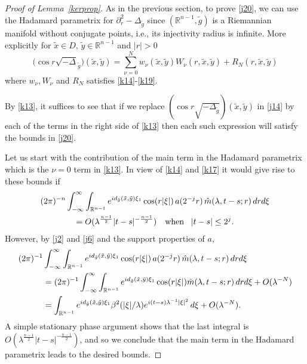 \documentclass[10pt]{amsart}
\newcommand{\la}{\lambda}
\newcommand{\1}{{\bf 1}}
\begin{document}
\begin{proof}[Proof of Lemma~\ref{kerprop}]
As in the previous section, to prove \eqref{j20}, we can use the Hadamard
parametrix for $\partial_r^2-\Delta_{\tilde g}$
since $({\mathbb R}^{n-1},\tilde g)$ is a Riemannian
manifold without conjugate points, i.e., its
 injectivity radius is infinite.  More explicitly for
$\tilde x\in D$, $\tilde y\in {\mathbb R}^{n-1}$
and $|r|>0$
\begin{equation}\label{k13}
\bigl(\cos r\sqrt{-\Delta}_{\tilde g}\bigr)(\tilde x,
\tilde y)=
\sum_{\nu=0}^N
w_\nu(\tilde x,\tilde y)W_\nu(r,\tilde x,\tilde y)
+R_N(r,\tilde x,\tilde y)
\end{equation}
where $w_\nu, W_\nu$ and $R_N$ satisfies \eqref{k14}-\eqref{k19}.




 By \eqref{k13}, it suffices
to see that if we replace $(\cos r\sqrt{-\Delta_{\tilde g}})(\tilde x,\tilde y)$ in \eqref{j14} by each
of the terms in the right side of \eqref{k13} then each such expression will satisfy the bounds
in \eqref{j20}.


Let us start with the contribution of the main term in the Hadamard parametrix which is the
$\nu=0$ term in \eqref{k13}.  In view of \eqref{k14} and \eqref{k17} it would give rise to these
bounds if
\begin{multline}\label{j28}
(2\pi)^{-n}\int_{-\infty}^\infty \int_{{\mathbb R}^{n-1}} e^{id_{\tilde g}(\tilde x,\tilde y)\xi_1}
\cos (r|\xi|) \, a(2^{-j}r) \, \Hat m(\la,t-s;r) \, dr d\xi
\\
=O(\la^{\frac{n-1}2}|t-s|^{-\frac{n-1}2}) \quad
\text{when }\,\,\, |t-s|\le 2^j .
\end{multline}
However, by \eqref{j2} and \eqref{j6} and the support properties of $a$, 
\begin{align}\label{j29}
(2\pi)^{-1}&\int_{-\infty}^\infty \int_{{\mathbb R}^{n-1}} e^{id_{\tilde g}(\tilde x,\tilde y)\xi_1}
\cos (r|\xi|) \, a(2^{-j}r) \, \Hat m(\la,t-s;r) \, dr d\xi
\\
&=
(2\pi)^{-1}\int_{-\infty}^\infty \int_{{\mathbb R}^{n-1}} e^{id_{\tilde g}(\tilde x,\tilde y)\xi_1}
\cos (r|\xi|) \Hat m(\la,t-s;r) \, dr d\xi+O(\la^{-N}) \notag
\\
&=\int_{{\mathbb R}^{n-1}} e^{id_{\tilde g}(\tilde x,\tilde y)\xi_1} \beta^2(|\xi|/\la) e^{i(t-s)\la^{-1}|\xi|^2} \, d\xi
+O(\la^{-N}). \notag
\end{align}
A simple stationary phase argument shows that the last integral is $O(\la^{\frac{n-1}2}|t-s|^{-\frac{n-1}2})$, and so  
we conclude that the main term in the Hadamard parametrix leads to the desired bounds.



\end{proof}
\end{document}
